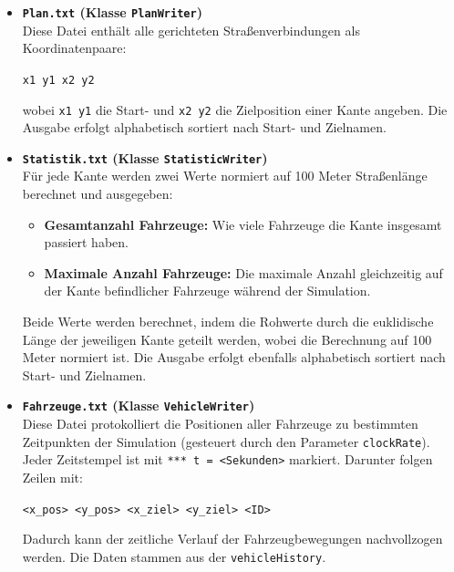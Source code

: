 \begin{itemize}
  \item \textbf{\texttt{Plan.txt} (Klasse \texttt{PlanWriter})} \\
  Diese Datei enthält alle gerichteten Straßenverbindungen als Koordinatenpaare:
  \begin{center}
    \texttt{x1 y1 x2 y2}
  \end{center}
  wobei \texttt{x1 y1} die Start- und \texttt{x2 y2} die Zielposition einer Kante angeben. Die Ausgabe erfolgt alphabetisch sortiert nach Start- und Zielnamen.

  \FloatBarrier
    \vspace{-2cm} 
\begin{figure}[h!]
    \vspace{-2cm} 
    \centering
\end{figure}

\clearpage

  \item \textbf{\texttt{Statistik.txt} (Klasse \texttt{StatisticWriter})} \\
  Für jede Kante werden zwei Werte normiert auf 100 Meter Straßenlänge berechnet und ausgegeben:
  \begin{itemize}
    \item \textbf{Gesamtanzahl Fahrzeuge:} Wie viele Fahrzeuge die Kante insgesamt passiert haben.
    \item \textbf{Maximale Anzahl Fahrzeuge:} Die maximale Anzahl gleichzeitig auf der Kante befindlicher Fahrzeuge während der Simulation.
  \end{itemize}
  Beide Werte werden berechnet, indem die Rohwerte durch die euklidische Länge der jeweiligen Kante geteilt werden, wobei die Berechnung auf 100 Meter normiert ist.
  Die Ausgabe erfolgt ebenfalls alphabetisch sortiert nach Start- und Zielnamen.

  \FloatBarrier
      \vspace{-2cm} 
\begin{figure}[h!]
        \vspace{-2cm} 
    \centering
\end{figure}

\clearpage

  \item \textbf{\texttt{Fahrzeuge.txt} (Klasse \texttt{VehicleWriter})} \\
  Diese Datei protokolliert die Positionen aller Fahrzeuge zu bestimmten Zeitpunkten der Simulation (gesteuert durch den Parameter \texttt{clockRate}). Jeder Zeitstempel ist mit \texttt{*** t = <Sekunden>} markiert. Darunter folgen Zeilen mit:
  \begin{center}
    \texttt{<x\_pos> <y\_pos> <x\_ziel> <y\_ziel> <ID>}
  \end{center}
  Dadurch kann der zeitliche Verlauf der Fahrzeugbewegungen nachvollzogen werden. Die Daten stammen aus der \texttt{vehicleHistory}.
\end{itemize}

